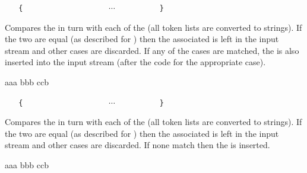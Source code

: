 \documentclass[oneside]{book}
\begin{document}
\begin{function}{\StrCaseT}
\begin{syntax}
 
~ ~ \verb|{|
~ ~ ~ ~  
~ ~ ~ ~  
~ ~ ~ ~ $\cdots$
~ ~ ~ ~  
~ ~ \verb|}|
~ ~ 
\end{syntax}
Compares the  in turn with each
of the  (all token lists are converted to strings).
If the two are equal (as described for
) then the associated  is left in the
input stream and other cases are discarded. If any of the
cases are matched, the  is also inserted into the
input stream (after the code for the appropriate case).
\begin{demohigh}
\IgnoreSpacesOn
{} {
  {aaa} {\TlSet{}}
  {bbb} {\TlSet{}}
  {ccb} {\TlSet{}}
}{
  \Result{\TlUse\lTmpkTl}
}
\IgnoreSpacesOff
\end{demohigh}
\end{function}

\begin{function}{\StrCaseF}
\begin{syntax}
 
~ ~ \verb|{|
~ ~ ~ ~  
~ ~ ~ ~  
~ ~ ~ ~ $\cdots$
~ ~ ~ ~  
~ ~ \verb|}|
~ ~ 
\end{syntax}
Compares the  in turn with each
of the  (all token lists are converted to strings).
If the two are equal (as described for
) then the associated  is left in the
input stream and other cases are discarded. If none
match then the  is inserted.
\begin{demohigh}
\IgnoreSpacesOn
{} {
  {aaa} {}
  {bbb} {}
  {ccb} {}
}{
}
\IgnoreSpacesOff
\end{demohigh}
\end{function}
\end{document}
